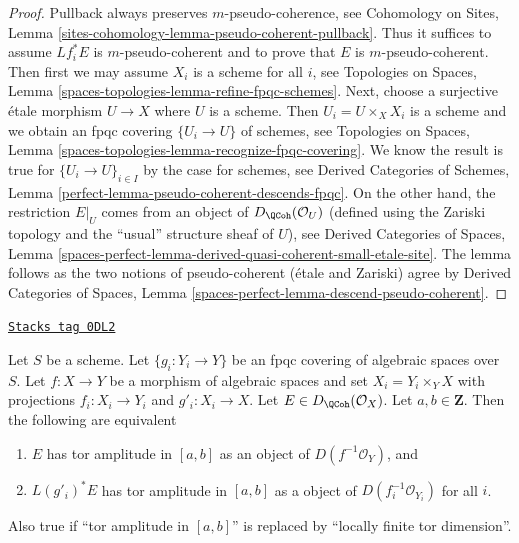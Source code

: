 \begin{proof}
Pullback always preserves $m$-pseudo-coherence, see
Cohomology on Sites, Lemma
\ref{sites-cohomology-lemma-pseudo-coherent-pullback}.
Thus it suffices to assume $Lf_i^*E$ is $m$-pseudo-coherent
and to prove that $E$ is $m$-pseudo-coherent.
Then first we may assume $X_i$ is a scheme for all $i$, see
Topologies on Spaces, Lemma \ref{spaces-topologies-lemma-refine-fpqc-schemes}.
Next, choose a  surjective \'etale morphism $U \to X$ where $U$ is a scheme.
Then $U_i = U \times_X X_i$ is a scheme and we obtain an fpqc covering
$\{U_i \to U\}$ of schemes, see
Topologies on Spaces, Lemma
\ref{spaces-topologies-lemma-recognize-fpqc-covering}.
We know the result is true for
$\{U_i \to U\}_{i \in I}$ by the case for schemes, see
Derived Categories of Schemes, Lemma
\ref{perfect-lemma-pseudo-coherent-descends-fpqc}.
On the other hand, the restriction $E|_U$ comes from
an object of $D_\QCoh(\mathcal{O}_U)$ (defined using the Zariski
topology and the ``usual'' structure sheaf of $U$), see
Derived Categories of Spaces, Lemma
\ref{spaces-perfect-lemma-derived-quasi-coherent-small-etale-site}.
The lemma follows as the two notions of pseudo-coherent
(\'etale and Zariski) agree by
Derived Categories of Spaces,
Lemma \ref{spaces-perfect-lemma-descend-pseudo-coherent}.
\end{proof}

\begin{lemma}
\label{spaces-more-morphisms-lemma-tor-amplitude-descends-fppf}
\href{https://stacks.math.columbia.edu/tag/0DL2}{\texttt{Stacks tag 0DL2}}

Let $S$ be a scheme. Let $\{g_i : Y_i \to Y\}$ be an fpqc covering of
algebraic spaces over $S$. Let $f : X \to Y$ be a morphism of algebraic
spaces and set $X_i = Y_i \times_Y X$ with projections $f_i : X_i \to Y_i$
and $g'_i : X_i \to X$. Let $E \in D_\QCoh(\mathcal{O}_X)$.
Let $a, b \in \mathbf{Z}$. Then the following are equivalent
\begin{enumerate}
\item $E$ has tor amplitude in $[a, b]$ as an object of
$D(f^{-1}\mathcal{O}_Y)$, and
\item $L(g'_i)^*E$ has tor amplitude in $[a, b]$ as a object of
$D(f_i^{-1}\mathcal{O}_{Y_i})$ for all $i$.
\end{enumerate}
Also true if ``tor amplitude in $[a, b]$'' is replaced by
``locally finite tor dimension''.
\end{lemma}

